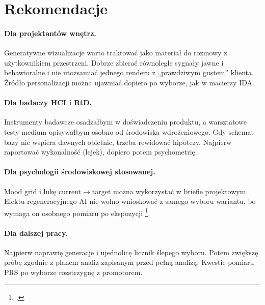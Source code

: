 \section{Rekomendacje}
\label{ch10:sec:rekomendacje}

\paragraph{Dla projektantów wnętrz.}
Generatywne wizualizacje warto traktować jako materiał do rozmowy z użytkownikiem przestrzeni. Dobrze zbierać równolegle sygnały jawne i behawioralne i nie utożsamiać jednego renderu z „prawdziwym gustem” klienta. Źródło personalizacji można ujawniać dopiero po wyborze, jak w macierzy IDA.

\paragraph{Dla badaczy HCI i RtD.}
Instrumenty badawcze osadzałbym w doświadczeniu produktu, a warsztatowe testy medium opisywałbym osobno od środowiska wdrożeniowego. Gdy schemat bazy nie wspiera dawnych obietnic, trzeba rewidować hipotezy. Najpierw raportować wykonalność (lejek), dopiero potem psychometrię.

\paragraph{Dla psychologii środowiskowej stosowanej.}
Mood grid i lukę current$\rightarrow$target można wykorzystać w briefie projektowym. Efektu regeneracyjnego AI nie wolno wnioskować z samego wyboru wariantu, bo wymaga on osobnego pomiaru po ekspozycji \footcite{kaplan1995restorative}.

\paragraph{Dla dalszej pracy.}
Najpierw naprawię generacje i ujednolicę licznik ślepego wyboru. Potem zwiększę próbę zgodnie z planem analiz zapisanym przed pełną analizą. Kwestię pomiaru PRS po wyborze rozstrzygnę z promotorem.
